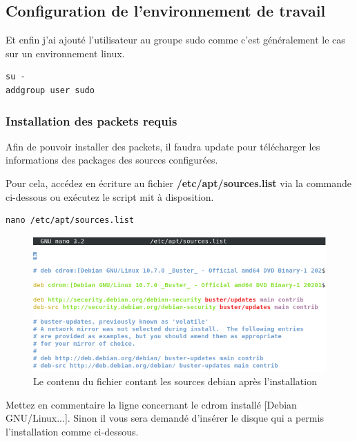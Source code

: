 \documentclass[12pt,a4paper]{article}
\begin{document}
\begin{flushleft}
       \subsection{Configuration de l'environnement de travail}
       
       \item Et enfin j'ai ajouté l'utilisateur au groupe sudo comme c'est généralement le cas sur un environnement linux.
       \begin{lstlisting}
su -
addgroup user sudo
       \end{lstlisting}
        \subsubsection{Installation des packets requis}
       \item Afin de pouvoir installer des packets, il faudra update pour télécharger les informations des packages des sources configurées. 
       \item Pour cela, accédez en écriture au fichier \textbf{/etc/apt/sources.list} via la commande ci-dessous ou exécutez le script mit à disposition.

       \begin{lstlisting}
nano /etc/apt/sources.list
       \end{lstlisting}      

       \begin{figure}[!h]
         \centering
               \includegraphics[scale=0.6]{sources.list}
            \caption{Le contenu du fichier contant les sources debian après l'installation}
        \end{figure}
        
       \item Mettez en commentaire la ligne concernant le cdrom installé [Debian GNU/Linux...]. Sinon il vous sera demandé d'insérer le disque qui a permis l'installation comme ci-dessous.             


\end{flushleft}
\end{document}

